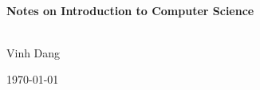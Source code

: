 \begin{titlepage}
	\vbox{ }
	
	\vbox{ }
	
	\begin{center}
		
		\vbox{ }
		\HRule \\[0.4cm]
		{ \huge \bfseries Notes on Introduction to Computer Science}\\[0.4cm]
		\HRule \\[1.5cm]

			\begin{center} \large
				Vinh Dang
			\end{center}

		
		\vfill
		{\large \today}
	\end{center}
\end{titlepage}